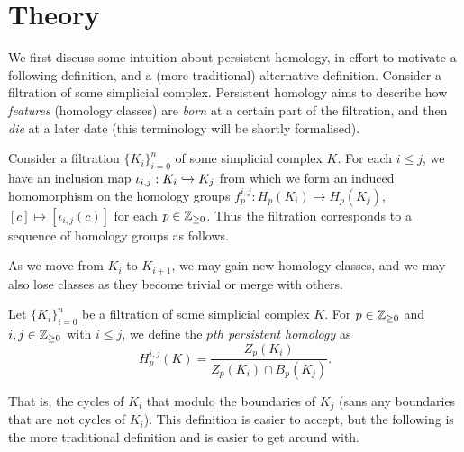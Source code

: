 
\section{Theory}

We first discuss some intuition about persistent homology, in effort to motivate a following definition, and a (more traditional) alternative definition. Consider a filtration of some simplicial complex. Persistent homology aims to describe how \emph{features} (homology classes) are \emph{born} at a certain part of the filtration, and then \emph{die} at a later date (this terminology will be shortly formalised).

Consider a filtration $\{K_i\}_{i=0}^n$ of some simplicial complex $K$. For each $i \leq j$, we have an inclusion map $\iota_{i,j}: K_i \xhookrightarrow{} K_j$ from which we form an induced homomorphism on the homology groups $f_p^{i,j}: H_p(K_i) \to H_p(K_j)$, $[c] \mapsto [\iota_{i,j}(c)]$ for each $p \in \mathbb{Z}_{\geq 0}$. Thus the filtration corresponds to a sequence of homology groups as follows. 

\begin{center}
\end{center}

As we move from $K_i$ to $K_{i+1}$, we may gain new homology classes, and we may also lose classes as they become trivial or merge with others. 

\begin{definition}
  Let $\{K_i\}_{i=0}^n$ be a filtration of some simplicial complex $K$. For $p \in \mathbb{Z}_{\geq0}$ and $i,j \in \mathbb{Z}_{\geq 0}$ with $i \leq j$, we define the \emph{$p$th persistent homology} as
  \[H_p^{i,j}(K)=\frac{Z_p(K_i)}{Z_p(K_i) \cap B_p(K_j)}.\]
\end{definition}

That is, the cycles of $K_i$ that modulo the boundaries of $K_j$ (sans any boundaries that are not cycles of $K_i$). This definition is easier to accept, but the following is the more traditional definition and is easier to get around with.

